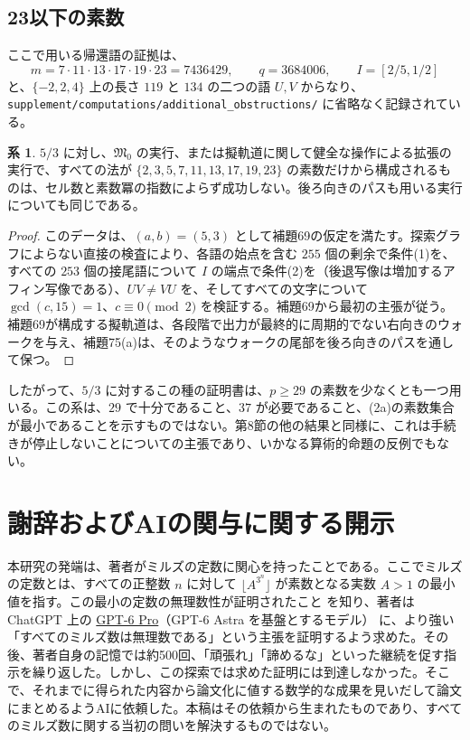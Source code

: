 \documentclass[11pt,reqno]{amsart}
\theoremstyle{definition}
\newtheorem{corollary}[theorem]{系}
\theoremstyle{definition}
\theoremstyle{remark}
\begin{document}
\subsection{23以下の素数}\label{sec:F.5}

ここで用いる帰還語の証拠は、
\[
m=7\cdot11\cdot13\cdot17\cdot19\cdot23=7436429,\qquad q=3684006,
\qquad I=[2/5,1/2]
\]
と、\(\{-2,2,4\}\) 上の長さ \(119\) と \(134\) の二つの語 \(U,V\) からなり、\nolinkurl{supplement/computations/additional_obstructions/} に省略なく記録されている。

\begin{samepage}
\begin{corollary}\leavevmode\label{thm:78}
\(5/3\) に対し、\(\mathfrak M_0\) の実行、または擬軌道に関して健全な操作による拡張の実行で、すべての法が \(\{2,3,5,7,11,13,17,19,23\}\) の素数だけから構成されるものは、セル数と素数冪の指数によらず成功しない。後ろ向きのパスも用いる実行についても同じである。
\label{thm-end:78}
\end{corollary}
\end{samepage}

\begin{proof}\leavevmode\label{proof:78}
このデータは、\((a,b)=(5,3)\) として補題69の仮定を満たす。探索グラフによらない直接の検査により、各語の始点を含む \(255\) 個の剰余で条件(1)を、すべての \(253\) 個の接尾語について \(I\) の端点で条件(2)を（後退写像は増加するアフィン写像である）、\(UV\ne VU\) を、そしてすべての文字について \(\gcd(c,15)=1\)、\(c\equiv0\pmod2\) を検証する。補題69から最初の主張が従う。補題69が構成する擬軌道は、各段階で出力が最終的に周期的でない右向きのウォークを与え、補題75(a)は、そのようなウォークの尾部を後ろ向きのパスを通して保つ。\qedhere
\end{proof}

したがって、\(5/3\) に対するこの種の証明書は、\(p\ge29\) の素数を少なくとも一つ用いる。この系は、\(29\) で十分であること、\(37\) が必要であること、(2a)の素数集合が最小であることを示すものではない。第8節の他の結果と同様に、これは手続きが停止しないことについての主張であり、いかなる算術的命題の反例でもない。

\section*{謝辞およびAIの関与に関する開示}

本研究の発端は、著者がミルズの定数に関心を持ったことである。ここでミルズの定数とは、すべての正整数 \(n\) に対して \(\lfloor A^{3^n}\rfloor\) が素数となる実数 \(A>1\) の最小値を指す。この最小の定数の無理数性が証明されたこと \cite{SA25} を知り、著者は ChatGPT 上の \href{https://help.openai.com/en/articles/20001354-gpt-5-6}{GPT-6 Pro}（GPT-6 Astra を基盤とするモデル） に、より強い「すべてのミルズ数は無理数である」という主張を証明するよう求めた。その後、著者自身の記憶では約500回、「頑張れ」「諦めるな」といった継続を促す指示を繰り返した。しかし、この探索では求めた証明には到達しなかった。そこで、それまでに得られた内容から論文化に値する数学的な成果を見いだして論文にまとめるようAIに依頼した。本稿はその依頼から生まれたものであり、すべてのミルズ数に関する当初の問いを解決するものではない。
\end{document}
